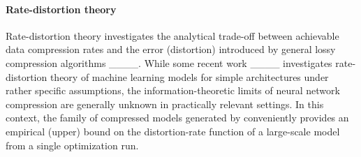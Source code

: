 \figureTradeoffCFour

\paragraph{Rate-distortion theory}

Rate-distortion theory investigates the analytical trade-off between
achievable data compression rates and the error (distortion) 
introduced by general lossy compression
algorithms ____.
While some recent work ____
investigates rate-distortion theory of machine learning models
for simple architectures under rather specific assumptions, 
the information-theoretic limits of neural network compression
are generally unknown in practically relevant settings.
In this context, the family of compressed models generated by \methodname conveniently provides an empirical (upper) bound on the distortion-rate function of a large-scale model from a single optimization run.
